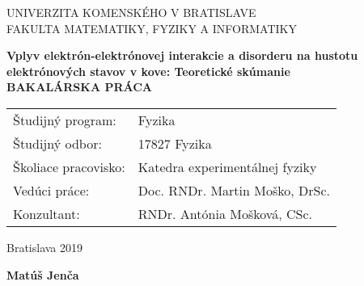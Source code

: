 \newpage
\thispagestyle{empty}
\begin{center}
{\large UNIVERZITA KOMENSKÉHO V BRATISLAVE \\
FAKULTA MATEMATIKY, FYZIKY A INFORMATIKY}
\end{center}


\vspace{5cm}
\begin{center}
{\large \bf Vplyv elektrón-elektrónovej interakcie a disorderu na hustotu elektrónových stavov v kove: Teoretické skúmanie \\
\vspace{3cm}
BAKALÁRSKA PRÁCA}
\end{center}

\vfill
\begin{flushleft}
\begin{tabular}{ll}
Študijný program: & Fyzika \\
Študijný odbor: & 17827 Fyzika \\
Školiace pracovisko: & Katedra experimentálnej fyziky \\
Vedúci práce: & Doc. RNDr. Martin Moško, DrSc. \\
Konzultant: & RNDr. Antónia Mošková, CSc. \\
\end{tabular}
\end{flushleft}

\vfill
%
\begin{multicols}{2}
\begin{flushleft} Bratislava 2019 \end{flushleft}
\begin{flushright} {\bf Matúš Jenča} \end{flushright}
\end{multicols}

